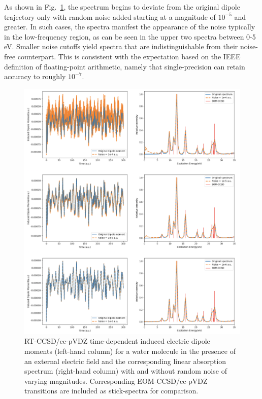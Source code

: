 As shown in Fig.~\ref{fig:sp-noise}, the spectrum begins to deviate from
the original dipole trajectory only with random noise added starting at a magnitude
of $10^{-5}$ and greater.  In such cases, the spectra manifest the appearance of
the noise typically in the low-frequency region, as can be seen in the upper two
spectra between 0-5 eV.  Smaller noise cutoffs yield spectra that are
indistinguishable from their noise-free counterpart.  This is consistent with
the expectation based on the IEEE definition of floating-point arithmetic,
namely that single-precision can retain accuracy to roughly $10^{-7}$. 
\begin{figure}
    \centering
    \includegraphics[angle=0, scale=0.6]{ch3/Figs/1-5.png}
    \caption{RT-CCSD/cc-pVDZ time-dependent induced electric dipole moments (left-hand
column) for a water molecule in the presence of an external electric field and
the corresponding linear absorption spectrum (right-hand column) with and
without random noise of varying magnitudes. Corresponding EOM-CCSD/cc-pVDZ 
transitions are included as stick-spectra for comparison.}
    \label{fig:sp-noise}
\end{figure}

